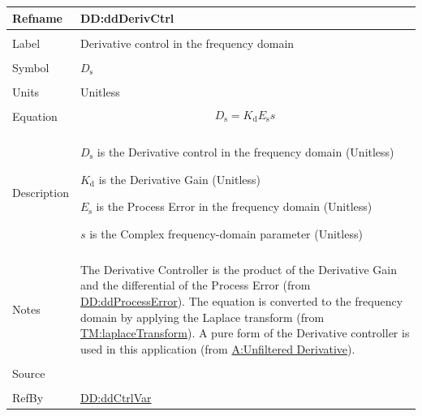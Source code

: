 \documentclass[12pt]{article}
\begin{document}
\vspace{\baselineskip}
\noindent
\begin{minipage}{\textwidth}
\begin{tabular}{>{\raggedright}p{}>{\raggedright\arraybackslash}p{}}
\toprule \textbf{Refname} & \textbf{DD:ddDerivCtrl}
\label{DD:ddDerivCtrl}
\\ \midrule \\
Label & Derivative control in the frequency domain
        
\\ \midrule \\
Symbol & ${D_{\text{s}}}$
         
\\ \midrule \\
Units & Unitless
        
\\ \midrule \\
Equation & \begin{displaymath}
           {D_{\text{s}}}={K_{\text{d}}} {E_{\text{s}}} s
           \end{displaymath}
\\ \midrule \\
Description & \begin{symbDescription}
              \item{${D_{\text{s}}}$ is the Derivative control in the frequency domain (Unitless)}
              \item{${K_{\text{d}}}$ is the Derivative Gain (Unitless)}
              \item{${E_{\text{s}}}$ is the Process Error in the frequency domain (Unitless)}
              \item{$s$ is the Complex frequency-domain parameter (Unitless)}
              \end{symbDescription}
\\ \midrule \\
Notes & The Derivative Controller is the product of the Derivative Gain and the differential of the Process Error (from \hyperref[DD:ddProcessError]{DD:ddProcessError}). The equation is converted to the frequency domain by applying the Laplace transform (from \hyperref[TM:laplaceTransform]{TM:laplaceTransform}). A pure form of the Derivative controller is used in this application (from \hyperref[unfilteredDerivative]{A:Unfiltered Derivative}).
        
\\ \midrule \\
Source & \cite{johnson2008}
         
\\ \midrule \\
RefBy & \hyperref[DD:ddCtrlVar]{DD:ddCtrlVar}
        
\\ \bottomrule
\end{tabular}
\end{minipage}
\end{document}
